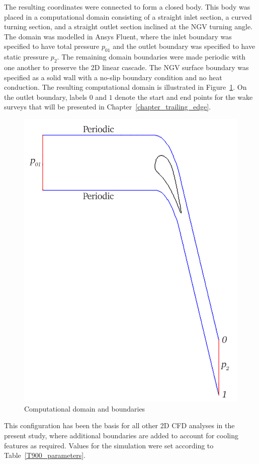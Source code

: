 \documentclass[a4paper, 11pt, oneside]{report}
\begin{document}
The resulting coordinates were connected to form a closed body. This body was placed in a computational domain consisting of a straight inlet section, a curved turning section, and a straight outlet section inclined at the NGV turning angle. The domain was modelled in Ansys Fluent, where the inlet boundary was specified to have total pressure $p_{01}$ and the outlet boundary was specified to have static pressure $p_2$. The remaining domain boundaries were made periodic with one another to preserve the 2D linear cascade. The NGV surface boundary was specified as a solid wall with a no-slip boundary condition and no heat conduction. The resulting computational domain is illustrated in Figure~\ref{fig:computational_domain_and_boundaries}. On the outlet boundary, labels $0$ and $1$ denote the start and end points for the wake surveys that will be presented in Chapter~\ref{chapter_trailing_edge}.

\begin{figure}[H]
	\centering
	\includegraphics[width=.6\textwidth]{figs/domain_boundary_conditions.png}
	\caption{Computational domain and boundaries}
	\label{fig:computational_domain_and_boundaries}
\end{figure}

This configuration has been the basis for all other 2D CFD analyses in the present study, where additional boundaries are added to account for cooling features as required. Values for the simulation were set according to Table~\ref{T900_parameters}.
\end{document}
